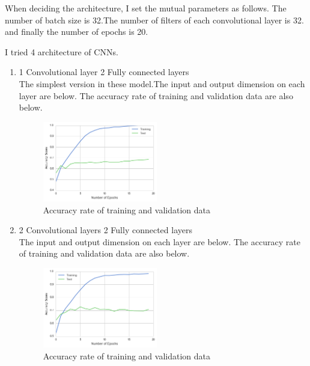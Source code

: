 \documentclass[a4paper,10pt,fleqn]{article}
\begin{document}
When deciding the architecture, I set the mutual parameters as follows.
The number of batch size is 32.The number of filters of each convolutional layer is 32. and finally the number of epochs is 20.

I tried 4 architecture of CNNs.

\begin{enumerate}
 \item 1 Convolutional layer  2 Fully connected layers \\
 The simplest version in these model.The input and output dimension on each layer are below.
 The accuracy rate of training and validation data are also below.
 
 \begin{figure}[htbp]

	\begin{center}
	\includegraphics[width=5cm]{picture/1layer_cnn.png}
	\caption{Accuracy rate of training and validation data}
	\end{center}
	\label{fig:eight}

\end{figure}
 
 \item 2 Convolutional layers  2 Fully connected layers \\
 The input and output dimension on each layer are below.
 The accuracy rate of training and validation data are also below.
 
 \begin{figure}[htbp]

	\begin{center}
	\includegraphics[width=5cm]{picture/2layer_cnn.png}
	\caption{Accuracy rate of training and validation data}
	\end{center}
	\label{fig:nine}


\end{figure}
\end{enumerate}
\end{document}
